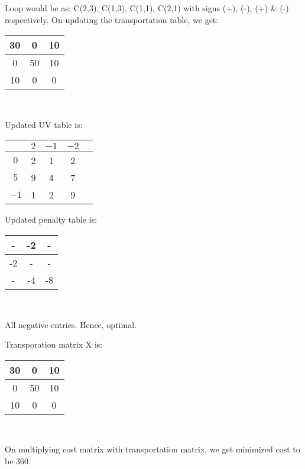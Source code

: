 \documentclass{beamer}
\begin{document}
\begin{frame}
Loop would be as: C(2,3), C(1,3), C(1,1), C(2,1) with signs (+), (-), (+) & (-) respectively.
On updating the transportation table, we get:

\begin{center}
\begin{tabular}{|c|c|c|}
\hline
30 & 0 & 10 \\\hline
0 & 50 & 10\\\hline
10 & 0 & 0\\ \hline

\end{tabular}\\
\end{center}

Updated UV table is:

\begin{center}

\begin{tabular}{c|c c c|c}
 & $2$ & $-1$ & $-2$\\ \hline
$0$ & 2 & 1 & 2 \\
$5$ & 9 & 4 & 7 \\
$-1$ & 1 & 2 & 9\\ \hline

\end{tabular}

\end{center}

Updated penalty table is:\\
\begin{center}
\begin{tabular}{|c|c|c|}
\hline
- & -2 & - \\\hline
-2 & - & -\\\hline
- & -4 & -8\\ \hline

\end{tabular}\\
\end{center}
All negative entries. Hence, optimal.
\end{frame}

\begin{frame}
Transporation matrix X is:
\begin{center}
\begin{tabular}{|c|c|c|}
\hline
30 & 0 & 10 \\\hline
0 & 50 & 10\\\hline
10 & 0 & 0\\ \hline

\end{tabular}\\
\end{center}
On multiplying cost matrix with transportation matrix, we get minimized cost to be 360.
\end{frame}
\end{document}
